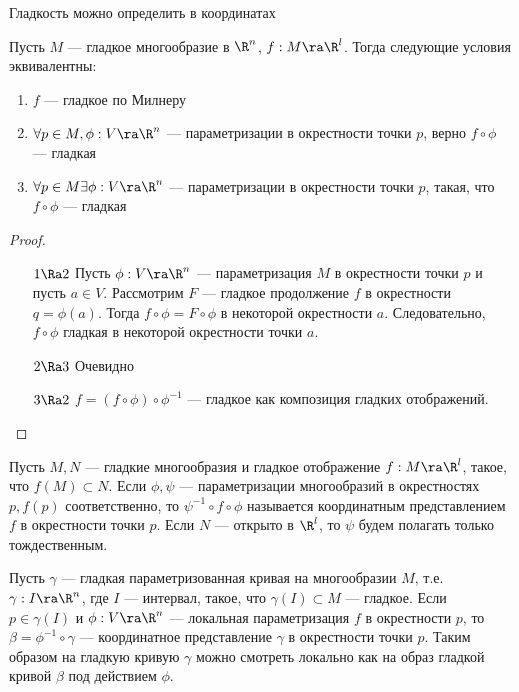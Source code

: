 
Гладкость можно определить в координатах
\begin{lemma}
    Пусть \(M\) --- гладкое многообразие в \(\R^n\), \(f: M \ra \R^l\). Тогда следующие условия эквивалентны:
    \begin{enumerate}
        \item \(f\) --- гладкое по Милнеру
        \item \(\forall p \in M, \phi: V \ra \R^n\) --- параметризации в окрестности точки \(p\), верно \(f \circ \phi\) --- гладкая
        \item \(\forall p \in M \exists \phi: V \ra \R^n\) --- параметризации в окрестности точки \(p\), такая, что \(f \circ \phi\) --- гладкая
    \end{enumerate}
\end{lemma}
\begin{proof}\indent
    \begin{enumerate}
        \item[\(1 \Ra 2\)] Пусть \(\phi: V \ra \R^n\) --- параметризация \(M\) в окрестности точки \(p\) и пусть \(a \in V\). Рассмотрим \(F\) --- гладкое продолжение \(f\) в окрестности \(q = \phi(a)\). Тогда \(f \circ \phi = F \circ \phi\) в некоторой окрестности \(a\). Следовательно, \(f \circ \phi\) гладкая в некоторой окрестности точки \(a\).
        
        \item [\(2 \Ra 3\)] Очевидно
        \item [\(3 \Ra 2\)] \(f = (f \circ \phi) \circ \phi^{-1}\) --- гладкое как композиция гладких отображений.
    \end{enumerate}    
\end{proof}

\begin{definition}
    Пусть \(M, N\) --- гладкие многообразия и гладкое отображение \(f: M \ra \R^l\), такое, что \(f(M) \subset N\). Если \(\phi, \psi\) --- параметризации многообразий в окрестностях \(p, f(p)\) соответственно, то \(\psi^{-1} \circ f \circ \phi\) называется координатным представлением \(f\) в окрестности точки \(p\). Если \(N\) --- открыто в \(\R^l\), то \(\psi\) будем полагать только тождественным.
\end{definition}

\begin{example}
    Пусть \(\gamma\) --- гладкая параметризованная кривая на многообразии \(M\), т.е. \(\gamma: I \ra \R^n\), где \(I\) --- интервал, такое, что \(\gamma(I) \subset M\) --- гладкое. Если \(p \in \gamma(I)\) и \(\phi: V \ra \R^n\) --- локальная параметризация \(f\) в окрестности \(p\), то \(\beta = \phi^{-1} \circ \gamma\) --- координатное представление \(\gamma\) в окрестности точки \(p\). Таким образом на гладкую кривую \(\gamma\) можно смотреть локально как на образ гладкой кривой \(\beta\) под действием \(\phi\).
\end{example}

